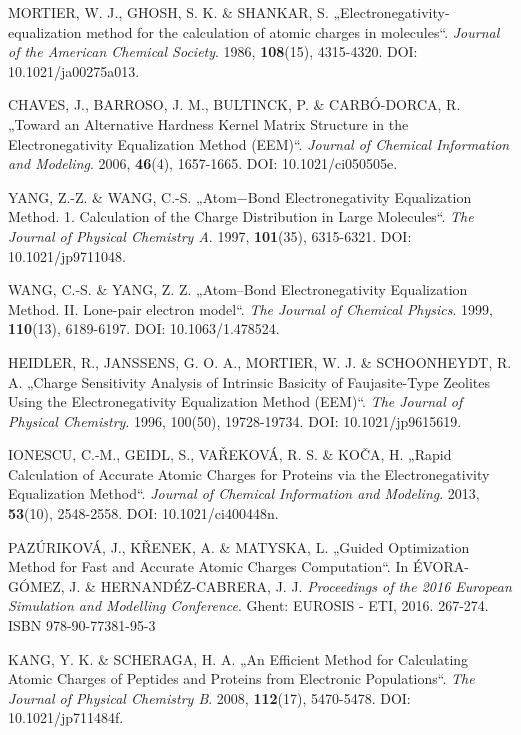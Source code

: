 \begin{thebibliography}{10}
MORTIER, W. J., GHOSH, S. K. \& SHANKAR, S. „Electronegativity-equalization method for the calculation of atomic charges in molecules“. \textit{Journal of the American Chemical Society}. 1986, \textbf{108}(15), 4315-4320. DOI: 10.1021/ja00275a013.

CHAVES, J., BARROSO, J. M., BULTINCK, P. \& CARBÓ-DORCA, R. „Toward an Alternative Hardness Kernel Matrix Structure in the Electronegativity Equalization Method (EEM)“. \textit{Journal of Chemical Information and Modeling}. 2006, \textbf{46}(4), 1657-1665. DOI: 10.1021/ci050505e.

YANG, Z.-Z. \& WANG, C.-S. „Atom−Bond Electronegativity Equalization Method. 1. Calculation of the Charge Distribution in Large Molecules“. \textit{The Journal of Physical Chemistry A}. 1997, \textbf{101}(35), 6315-6321. DOI: 10.1021/jp9711048. 

WANG, C.-S. \& YANG, Z. Z. „Atom–Bond Electronegativity Equalization Method. II. Lone-pair electron model“. \textit{The Journal of Chemical Physics}. 1999, \textbf{110}(13), 6189-6197. DOI: 10.1063/1.478524.

HEIDLER, R., JANSSENS, G. O. A., MORTIER, W. J. \& SCHOONHEYDT, R. A. „Charge Sensitivity Analysis of Intrinsic Basicity of Faujasite-Type Zeolites Using the Electronegativity Equalization Method (EEM)“. \textit{The Journal of Physical Chemistry}. 1996, 100(50), 19728-19734. DOI: 10.1021/jp9615619.

IONESCU, C.-M., GEIDL, S., VAŘEKOVÁ, R. S. \& KOČA, H. „Rapid Calculation of Accurate Atomic Charges for Proteins via the Electronegativity Equalization Method“. \textit{Journal of Chemical Information and Modeling}. 2013, \textbf{53}(10), 2548-2558. DOI: 10.1021/ci400448n.

PAZÚRIKOVÁ, J., KŘENEK, A. \& MATYSKA, L. „Guided Optimization Method for Fast and Accurate Atomic Charges Computation“. In ÉVORA-GÓMEZ, J. \& HERNANDÉZ-CABRERA, J. J. \textit{Proceedings of the 2016 European Simulation and Modelling Conference}. Ghent: EUROSIS - ETI, 2016. 267-274. ISBN 978-90-77381-95-3

KANG, Y. K. \& SCHERAGA, H. A. „An Efficient Method for Calculating Atomic Charges of Peptides and Proteins from Electronic Populations“. \textit{The Journal of Physical Chemistry B}. 2008, \textbf{112}(17), 5470-5478. DOI: 10.1021/jp711484f.


\end{thebibliography}
